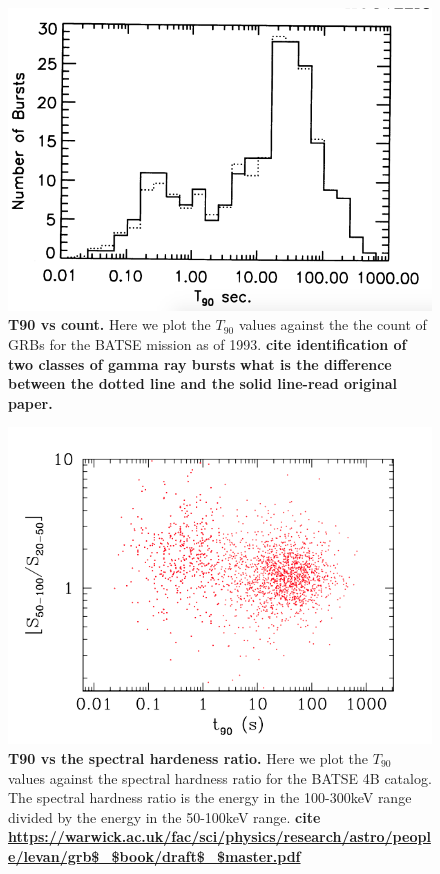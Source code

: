\documentclass[11pt]{cuthesis}
\begin{document}
\begin{figure} %
\begin{center}
\includegraphics[width=0.8\linewidth]{t90_vs_count.png}
\end{center}
\caption{\textbf{T90 vs count.} Here we plot the $T_{90}$ values against the the count of GRBs for the BATSE mission as of 1993. \textbf{cite identification of two classes of gamma ray bursts} \textbf{what is the difference between the dotted line and the solid line-read original paper.}}
\label{fig:t90 vs count}
\end{figure}

\begin{figure} %
\begin{center}
\includegraphics[width=0.8\linewidth]{t90_vs_hardness.png}
\end{center}
\caption{\textbf{T90 vs the spectral hardeness ratio.} Here we plot the $T_{90}$ values against the spectral hardness ratio for the BATSE 4B catalog. The spectral hardness ratio is the energy in the 100-300keV range divided by the energy in the 50-100keV range. \textbf{cite \url{https://warwick.ac.uk/fac/sci/physics/research/astro/people/levan/grb$_$book/draft$_$master.pdf} }}
\label{fig:t90 vs hardness}
\end{figure}
\end{document}
